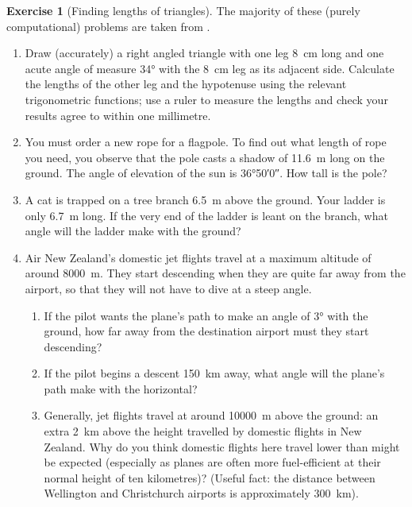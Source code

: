\documentclass[a4paper]{report}
\theoremstyle{definition}
\newtheorem{exercise}[thm]{Exercise}
\begin{document}
  \begin{exercise}[Finding lengths of triangles]
    The majority of these (purely computational) problems are taken from \autocite{foerster}.
    \begin{enumerate}
      \item Draw (accurately) a right angled triangle with one leg \SI{8}{\centi\metre} long
            and one acute angle of measure \ang{34} with the \SI{8}{\centi\metre} leg as its adjacent
            side. Calculate the lengths of the other leg and the hypotenuse using the relevant trigonometric functions;
            use a ruler to measure the lengths and check your results agree to within one millimetre.
      \item You must order a new rope for a flagpole. To find out what length of rope you need, you observe that the pole
            casts a shadow of \SI{11.6}{\metre} long on the ground. The angle of elevation of the sun is \ang{36;50;0}. How
            tall is the pole?
      \item A cat is trapped on a tree branch \SI{6.5}{\metre} above the ground. Your ladder is only \SI{6.7}{\metre} long.
            If the very end of the ladder is leant on the branch, what angle will the ladder make with the ground?
      \item Air New Zealand's domestic jet flights travel at a maximum altitude of around \SI{8000}{\metre}. They start
            descending when they are quite far away from the airport, so that they will not have to dive at a steep angle.
        \begin{enumerate}
          \item If the pilot wants the plane's path to make an angle of \ang{3} with the ground, how far away from the destination
                airport must they start descending?
          \item If the pilot begins a descent \SI{150}{\kilo\metre} away, what angle will the plane's path make with the horizontal?
          \item Generally, jet flights travel at around \SI{10000}{\metre} above the ground: an extra \SI{2}{\kilo\metre} above the
                height travelled by domestic flights in New Zealand. Why do you think domestic flights here travel lower than might
                be expected (especially as planes are often more fuel-efficient at their normal height of ten kilometres)? (Useful
                fact: the distance between Wellington and Christchurch airports is approximately \SI{300}{\kilo\metre}).
        \end{enumerate}

\end{enumerate}
\end{exercise}
\end{document}
